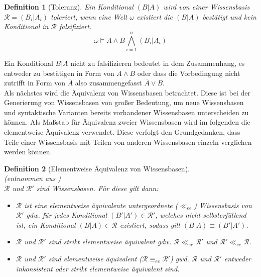 \documentclass[12pt,a4paper]{article}
\newtheorem{theorem}{Definition}
\begin{document}
\begin{theorem}[Toleranz]
Ein Konditional $(B|A)$ wird von einer Wissensbasis $\mathcal{R} = {(B_i|A_i)}$ toleriert, wenn eine Welt $\omega$ existiert die $(B|A)$ bestätigt und kein Konditional in $\mathcal{R}$ falsifiziert.
\begin{equation}
\omega \models A \wedge B \bigwedge^n_{i=1}(B_i|A_i)
\end{equation}
\end{theorem}
Ein Konditional $B|A$ nicht zu falsifizieren bedeutet in dem Zusammenhang, es entweder zu bestätigen in Form von $A \wedge B$ oder dass die Vorbedingung nicht zutrifft in Form von $\overline{A}$ also zusammengefasst $\overline{A} \vee B$. \\
Als nächstes wird die Äquivalenz von Wissensbasen betrachtet. Diese ist bei der Generierung von Wissensbasen von großer Bedeutung, um neue Wissensbasen und syntaktische Varianten bereits vorhandener Wissensbasen unterscheiden zu können. Als Maßstab für Äquivalenz zweier Wissensbasen wird im folgenden die elementweise Äquivalenz verwendet. Diese verfolgt den Grundgedanken, dass Teile einer Wissensbasis mit Teilen von anderen Wissensbasen einzeln verglichen werden können.
\begin{theorem}[Elementweise Äquivalenz von Wissensbasen] \ \\(entnommen aus \cite{beierle17b}) \ \\
$\mathcal{R}$ und $\mathcal{R'}$ sind Wissensbasen. Für diese gilt dann:
\begin{itemize}
\item{$\mathcal{R}$ ist eine elementweise äquivalente untergeordnete ($\ll_{ee}$) Wissensbasis von $\mathcal{R'}$ gdw. für jedes Konditional $(B'|A') \in \mathcal{R'}$, welches nicht selbsterfüllend ist, ein Konditional $(B|A) \in \mathcal{R}$ existiert, sodass gilt $(B|A) \equiv (B'|A')$.}
\item{$\mathcal{R}$ und $\mathcal{R'}$ sind strikt elementweise äquivalent gdw. $\mathcal{R} \ll_{ee} \mathcal{R'}$ und $\mathcal{R}' \ll_{ee}\mathcal{R}$.}
\item{$\mathcal{R}$ und $\mathcal{R'}$ sind elementweise äquivalent ($\mathcal{R} \equiv_{ee} \mathcal{R'}$) gwd. $\mathcal{R}$ und $\mathcal{R'}$ entweder inkonsistent oder strikt elementweise äquivalent sind.}
\end{itemize}
\end{theorem}
\end{document}
